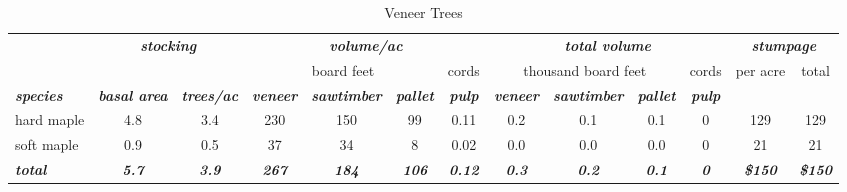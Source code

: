 \documentclass[landscape]{article}
\begin{document}
\begin{table}[H]

\caption{\label{tab:unnamed-chunk-46}Veneer Trees}
\fontsize{10}{12}\selectfont
\begin{tabular}[t]{lcccccccccccc}
\toprule
\multicolumn{1}{c}{\em{\textbf{ }}} & \multicolumn{2}{c}{\em{\textbf{stocking}}} & \multicolumn{4}{c}{\em{\textbf{volume/ac }}} & \multicolumn{4}{c}{\em{\textbf{total volume}}} & \multicolumn{2}{c}{\em{\textbf{stumpage}}} \\
\cmidrule(l{3pt}r{3pt}){2-3} \cmidrule(l{3pt}r{3pt}){4-7} \cmidrule(l{3pt}r{3pt}){8-11} \cmidrule(l{3pt}r{3pt}){12-13}
\multicolumn{3}{c}{ } & \multicolumn{3}{c}{board feet} & \multicolumn{1}{c}{cords} & \multicolumn{3}{c}{thousand board feet} & \multicolumn{1}{c}{cords} & \multicolumn{1}{c}{per acre} & \multicolumn{1}{c}{total} \\
\cmidrule(l{3pt}r{3pt}){4-6} \cmidrule(l{3pt}r{3pt}){7-7} \cmidrule(l{3pt}r{3pt}){8-10} \cmidrule(l{3pt}r{3pt}){11-11} \cmidrule(l{3pt}r{3pt}){12-12} \cmidrule(l{3pt}r{3pt}){13-13}
\rowcolor[HTML]{DCDCDC}  \em{\textbf{species}} & \em{\textbf{basal area}} & \em{\textbf{trees/ac}} & \em{\textbf{veneer}} & \em{\textbf{sawtimber}} & \em{\textbf{pallet}} & \em{\textbf{pulp}} & \em{\textbf{veneer}} & \em{\textbf{sawtimber}} & \em{\textbf{pallet}} & \em{\textbf{pulp}} & \em{\textbf{ }} & \em{\textbf{ }}\\
\midrule
\rowcolor{gray!6}  hard maple & 4.8 & 3.4 & 230 & 150 & 99 & 0.11 & 0.2 & 0.1 & 0.1 & 0 & 129 & 129\\
 
soft maple & 0.9 & 0.5 & 37 & 34 & 8 & 0.02 & 0.0 & 0.0 & 0.0 & 0 & 21 & 21\\
 
\rowcolor{gray!6}  \rowcolor[HTML]{DCDCDC}  \em{\textbf{total}} & \em{\textbf{5.7}} & \em{\textbf{3.9}} & \em{\textbf{267}} & \em{\textbf{184}} & \em{\textbf{106}} & \em{\textbf{0.12}} & \em{\textbf{0.3}} & \em{\textbf{0.2}} & \em{\textbf{0.1}} & \em{\textbf{0}} & \em{\textbf{\$150}} & \em{\textbf{\$150}}\\
\bottomrule
\end{tabular}
\end{table}
\end{document}
